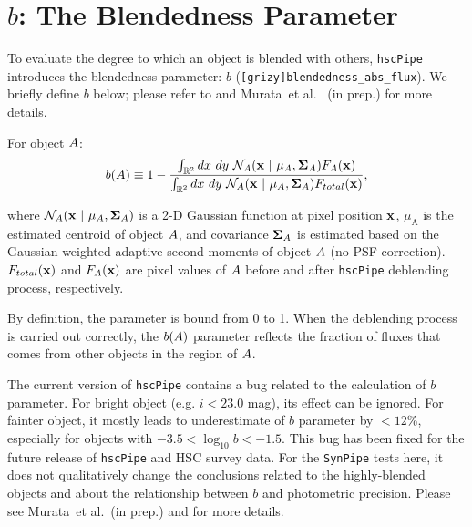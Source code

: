 \documentclass[useamsfonts]{pasj01}
\def\etal{{\ et al.~}}
\def\hscpipe{\texttt{hscPipe}}
\def\synpipe{\texttt{SynPipe}}
\begin{document}

\section{$b$: The Blendedness Parameter}
    \label{app:defineb}

    To evaluate the degree to which an object is blended with others, \hscpipe{} 
    introduces the blendedness parameter: $b$ (\texttt{[grizy]blendedness\_abs\_flux}).
    We briefly define  $b$ below; please refer to \citet{Bosch2017} and Murata\etal 
    (in prep.) for more details.

    For object ${\rm A}$:
    \begin{eqnarray*}
        b({\rm A}) \equiv
        1-\frac{\int_{\mathbb{R}^2} {\rm d}x~ {\rm d}y\ \mathcal{N}_{\mathrm{A}}({\bf x}\ |\  \mu_{\mathrm{A}}, {\bf\Sigma}_{\mathrm{A}})
        F_{\mathrm{A}}({\bf x})}{\int_{\mathbb{R}^2} {\rm d}x~ {\rm d}y\ \mathcal{N}_{\mathrm{A}}({\bf x}\ |\  \mu_{\mathrm{A}},
        {\bf\Sigma}_{\rm{A}}) F_{\rm{total}}({\bf x})},
        \label{eq:defineb}
    \end{eqnarray*}

    \noindent
    where $\mathcal{N}_{\rm{A}}({ \bf x }\ |\  \mu_{\rm{A}}, {\bf\Sigma}_{\rm{A}})$
    is a 2-D Gaussian function at pixel position $\bf x$, $\mu_{\mathrm{A}}$ is the
    estimated centroid of object ${\rm A}$, and covariance ${\bf \Sigma}_{\mathrm{A}}$
    is estimated based on the Gaussian-weighted adaptive second moments of object
    ${\rm A}$ (no PSF correction).
    $F_{\mathrm{total}}({\bf x })$ and $F_{\rm{A}}({\bf x })$ are pixel values of
    ${\rm A}$ before and after \hscpipe{} deblending process, respectively.

    By definition, the parameter is bound from 0 to 1.
    When the deblending process is carried out correctly, the $b({\rm A})$ parameter
    reflects the fraction of fluxes that comes from other objects in the
    region of ${\rm A}$.
    
    The current version of \hscpipe{} contains a bug related to the calculation of $b$
    parameter. 
    For bright object (e.g. $i<23.0$ mag), its effect can be ignored.  
    For fainter object, it mostly leads to underestimate of $b$ parameter by $< 12$\%, 
    especially for objects with $-3.5 < \log_{10} b < -1.5$. 
    This bug has been fixed for the future release of \hscpipe{} and HSC survey data. 
    For the \synpipe{} tests here, it does not qualitatively change the conclusions 
    related to the highly-blended objects and about the relationship between $b$ and
    photometric precision. 
    Please see Murata\etal (in prep.) and \citet{Bosch2017} for more details. 
    

\label{lastpage}
\end{document}

